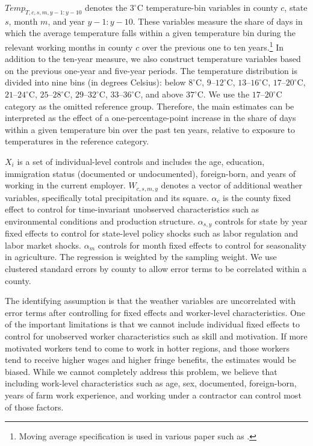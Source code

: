 \documentclass[12pt]{article}
\begin{document}
$Temp_{T, c, s, m, y-1:y-10}$ denotes the $3^\circ$C temperature-bin variables in county $c$, state $s$, month $m$, and year $y-1:y-10$. These variables measure the share of days in which the average temperature falls within a given temperature bin during the relevant working months in county $c$ over the previous one to ten years.\footnote{Moving average specification is used in various paper such as \cite{cui_climate_2020, cui_adapting_2022}.} In addition to the ten-year measure, we also construct temperature variables based on the previous one-year and five-year periods. The temperature distribution is divided into nine bins (in degrees Celsius): below $8^\circ$C, $9$--$12^\circ$C, $13$--$16^\circ$C, $17$--$20^\circ$C, $21$--$24^\circ$C, $25$--$28^\circ$C, $29$--$32^\circ$C, $33$--$36^\circ$C, and above $37^\circ$C. We use the $17$--$20^\circ$C category as the omitted reference group. Therefore, the main estimates can be interpreted as the effect of a one-percentage-point increase in the share of days within a given temperature bin over the past ten years, relative to exposure to temperatures in the reference category.

$X_{i}$ is a set of individual-level controls and includes the age, education, immigration status (documented or undocumented), foreign-born, and years of working in the current employer. $W_{c,s,m,y}$ denotes a vector of additional weather variables, specifically total precipitation and its square. $\alpha_{c}$ is the county fixed effect to control for time-invariant unobserved characteristics such as environmental conditions and production structure. $\alpha_{s,y}$ controls for state by year fixed effects to control for state-level policy shocks such as labor regulation and labor market shocks. $\alpha_{m}$ controls for month fixed effects to control for seasonality in agriculture. The regression is weighted by the sampling weight. We use clustered standard errors by county to allow error terms to be correlated within a county. 

The identifying assumption is that the weather variables are uncorrelated with error terms after controlling for fixed effects and worker-level characteristics. One of the important limitations is that we cannot include individual fixed effects to control for unobserved worker characteristics such as skill and motivation. If more motivated workers tend to come to work in hotter regions, and those workers tend to receive higher wages and higher fringe benefits, the estimates would be biased. While we cannot completely address this problem, we believe that including work-level characteristics such as age, sex, documented, foreign-born, years of farm work experience, and working under a contractor can control most of those factors. 
\end{document}
